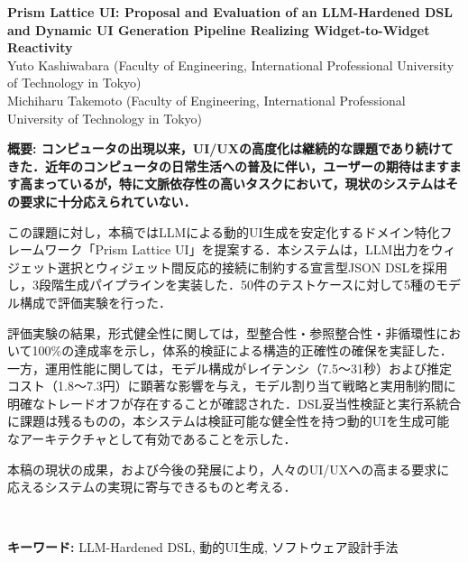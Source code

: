 \documentclass[a4paper,10pt]{jarticle}
\begin{document}
\title{}
\author{
\Large{柏原 悠斗 (東京国際工科専門職大学 工科学部)} \\
\Large{武本 充治 (東京国際工科専門職大学 工科学部)}
}
\date{}
\maketitle
\vspace{5mm}
%
\vspace{-10mm}
\begin{center}
\Large{\bf Prism Lattice UI: Proposal and Evaluation of an LLM-Hardened DSL and Dynamic UI Generation Pipeline Realizing Widget-to-Widget Reactivity} \\ 
\large{Yuto Kashiwabara (Faculty of Engineering, 
International Professional University of Technology in Tokyo)} \\
\large{Michiharu Takemoto (Faculty of Engineering, 
International Professional University of Technology in Tokyo)}
\end{center}


\normalsize{
\hspace{-5mm} 
\bf{概要:}
コンピュータの出現以来，UI/UXの高度化は継続的な課題であり続けてきた．近年のコンピュータの日常生活への普及に伴い，ユーザーの期待はますます高まっているが，特に文脈依存性の高いタスクにおいて，現状のシステムはその要求に十分応えられていない．

この課題に対し，本稿ではLLMによる動的UI生成を安定化するドメイン特化フレームワーク「Prism Lattice UI」を提案する．本システムは，LLM出力をウィジェット選択とウィジェット間反応的接続に制約する宣言型JSON DSLを採用し，3段階生成パイプラインを実装した．50件のテストケースに対して5種のモデル構成で評価実験を行った．

評価実験の結果，形式健全性に関しては，型整合性・参照整合性・非循環性において100\%の達成率を示し，体系的検証による構造的正確性の確保を実証した．一方，運用性能に関しては，モデル構成がレイテンシ（7.5〜31秒）および推定コスト（1.8〜7.3円）に顕著な影響を与え，モデル割り当て戦略と実用制約間に明確なトレードオフが存在することが確認された．DSL妥当性検証と実行系統合に課題は残るものの，本システムは検証可能な健全性を持つ動的UIを生成可能なアーキテクチャとして有効であることを示した．

本稿の現状の成果，および今後の発展により，人々のUI/UXへの高まる要求に応えるシステムの実現に寄与できるものと考える．
}
\\
\vspace{-7mm}
\begin{center}
\normalsize{\bf{キーワード:}} LLM-Hardened DSL, 動的UI生成, ソフトウェア設計手法
%
\end{center}
\end{document}
